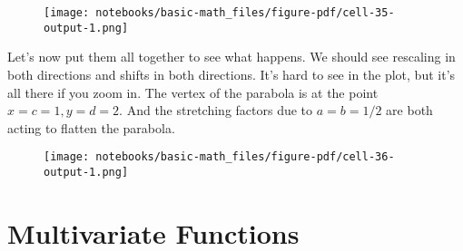 \documentclass[
  letterpaper,
  DIV=11,
  numbers=noendperiod]{scrreprt}
\newenvironment{Shaded}{\begin{snugshade}}{\end{snugshade}}
\newcommand{\DecValTok}[1]{\textcolor[rgb]{0.68,0.00,0.00}{#1}}
\newcommand{\KeywordTok}[1]{\textcolor[rgb]{0.00,0.23,0.31}{#1}}
\newcommand{\NormalTok}[1]{\textcolor[rgb]{0.00,0.23,0.31}{#1}}
\newcommand{\OperatorTok}[1]{\textcolor[rgb]{0.37,0.37,0.37}{#1}}
\newcommand{\SpecialCharTok}[1]{\textcolor[rgb]{0.37,0.37,0.37}{#1}}
\newcommand{\SpecialStringTok}[1]{\textcolor[rgb]{0.13,0.47,0.30}{#1}}
\begin{document}
\begin{figure}[H]

{\centering \texttt{[image: notebooks/basic-math\_files/figure-pdf/cell-35-output-1.png]}

}

\end{figure}

Let's now put them all together to see what happens. We should see
rescaling in both directions and shifts in both directions. It's hard to
see in the plot, but it's all there if you zoom in. The vertex of the
parabola is at the point \(x=c=1, y=d=2\). And the stretching factors
due to \(a=b=1/2\) are both acting to flatten the parabola.

\begin{Shaded}
\end{Shaded}

\begin{figure}[H]

{\centering \texttt{[image: notebooks/basic-math\_files/figure-pdf/cell-36-output-1.png]}

}

\end{figure}

\hypertarget{multivariate-functions}{%
\section{Multivariate Functions}\label{multivariate-functions}}
\end{document}

